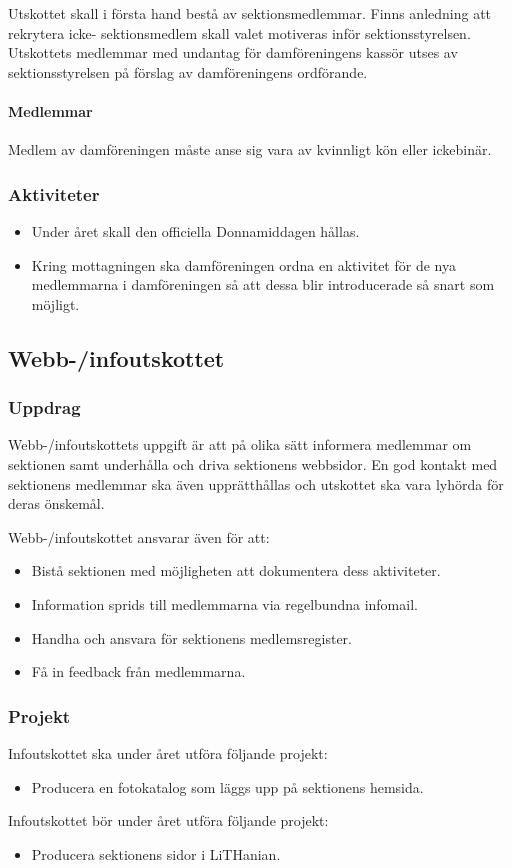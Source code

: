 \documentclass{datateknologsektionen-document}
\begin{document}
Utskottet skall i första hand bestå av sektionsmedlemmar. Finns anledning att rekrytera icke-
sektionsmedlem skall valet motiveras inför sektionsstyrelsen. Utskottets medlemmar med 
undantag för damföreningens kassör utses av sektionsstyrelsen på förslag av damföreningens
ordförande.
\paragraph{Medlemmar}
Medlem av damföreningen måste anse sig vara av kvinnligt kön eller ickebinär.
\subsubsection{Aktiviteter}
\begin{itemize}
  \item Under året skall den officiella Donnamiddagen hållas.
  \item Kring mottagningen ska damföreningen ordna en aktivitet för de nya medlemmarna i damföreningen så att dessa blir introducerade så snart som möjligt.
\end{itemize}

\subsection{Webb-/infoutskottet}
\label{webbinfo}
\subsubsection{Uppdrag}
Webb-/infoutskottets uppgift är att på olika sätt informera medlemmar om sektionen samt
underhålla och driva sektionens webbsidor. En god kontakt med sektionens medlemmar ska
även upprätthållas och utskottet ska vara lyhörda för deras önskemål.

Webb-/infoutskottet ansvarar även för att:
\begin{itemize}
  \item Bistå sektionen med möjligheten att dokumentera dess aktiviteter.
  \item Information sprids till medlemmarna via regelbundna infomail.
  \item Handha och ansvara för sektionens medlemsregister.
  \item Få in feedback från medlemmarna.
\end{itemize}

\subsubsection{Projekt}
Infoutskottet ska under året utföra följande projekt:
\begin{itemize}
  \item Producera en fotokatalog som läggs upp på sektionens hemsida.
\end{itemize}
Infoutskottet bör under året utföra följande projekt:
\begin{itemize}
  \item Producera sektionens sidor i LiTHanian.
\end{itemize}
\end{document}
